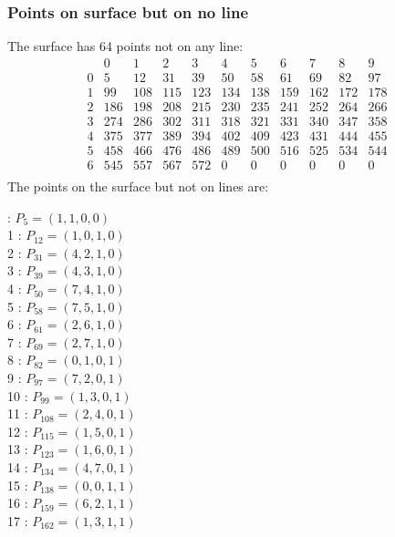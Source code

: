 \documentclass{article}
\begin{document}
{\subsubsection*{Points on surface but on no line}
The surface has 64 points not on any line:\\
$$
\begin{array}{r|*{10}{r}}
 & 0 & 1 & 2 & 3 & 4 & 5 & 6 & 7 & 8 & 9\\
\hline
0 & 5 & 12 & 31 & 39 & 50 & 58 & 61 & 69 & 82 & 97\\
1 & 99 & 108 & 115 & 123 & 134 & 138 & 159 & 162 & 172 & 178\\
2 & 186 & 198 & 208 & 215 & 230 & 235 & 241 & 252 & 264 & 266\\
3 & 274 & 286 & 302 & 311 & 318 & 321 & 331 & 340 & 347 & 358\\
4 & 375 & 377 & 389 & 394 & 402 & 409 & 423 & 431 & 444 & 455\\
5 & 458 & 466 & 476 & 486 & 489 & 500 & 516 & 525 & 534 & 544\\
6 & 545 & 557 & 567 & 572 & 0 & 0 & 0 & 0 & 0 & 0\\
\end{array}
$$
The points on the surface but not on lines are:\\
\begin{multicols}{2}
 : $P_{5}=( 1, 1, 0, 0 )$\\
1 : $P_{12}=( 1, 0, 1, 0 )$\\
2 : $P_{31}=( 4, 2, 1, 0 )$\\
3 : $P_{39}=( 4, 3, 1, 0 )$\\
4 : $P_{50}=( 7, 4, 1, 0 )$\\
5 : $P_{58}=( 7, 5, 1, 0 )$\\
6 : $P_{61}=( 2, 6, 1, 0 )$\\
7 : $P_{69}=( 2, 7, 1, 0 )$\\
8 : $P_{82}=( 0, 1, 0, 1 )$\\
9 : $P_{97}=( 7, 2, 0, 1 )$\\
10 : $P_{99}=( 1, 3, 0, 1 )$\\
11 : $P_{108}=( 2, 4, 0, 1 )$\\
12 : $P_{115}=( 1, 5, 0, 1 )$\\
13 : $P_{123}=( 1, 6, 0, 1 )$\\
14 : $P_{134}=( 4, 7, 0, 1 )$\\
15 : $P_{138}=( 0, 0, 1, 1 )$\\
16 : $P_{159}=( 6, 2, 1, 1 )$\\
17 : $P_{162}=( 1, 3, 1, 1 )$\\

\end{multicols}}
\end{document}
